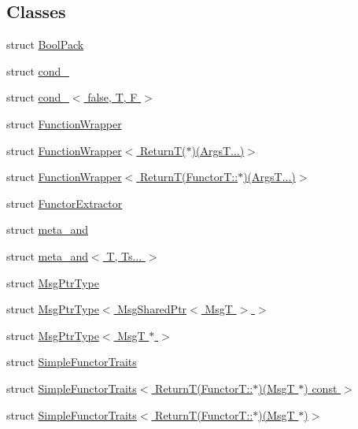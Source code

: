 \subsection*{Classes}
\begin{DoxyCompactItemize}
\item 
struct \hyperlink{structvt_1_1util_1_1_bool_pack}{Bool\+Pack}
\item 
struct \hyperlink{structvt_1_1util_1_1cond__}{cond\+\_\+}
\item 
struct \hyperlink{structvt_1_1util_1_1cond___3_01false_00_01_t_00_01_f_01_4}{cond\+\_\+$<$ false, T, F $>$}
\item 
struct \hyperlink{structvt_1_1util_1_1_function_wrapper}{Function\+Wrapper}
\item 
struct \hyperlink{structvt_1_1util_1_1_function_wrapper_3_01_return_t_07_5_08_07_args_t_8_8_8_08_4}{Function\+Wrapper$<$ Return\+T($\ast$)(\+Args\+T...)$>$}
\item 
struct \hyperlink{structvt_1_1util_1_1_function_wrapper_3_01_return_t_07_functor_t_1_1_5_08_07_args_t_8_8_8_08_4}{Function\+Wrapper$<$ Return\+T(\+Functor\+T\+::$\ast$)(\+Args\+T...)$>$}
\item 
struct \hyperlink{structvt_1_1util_1_1_functor_extractor}{Functor\+Extractor}
\item 
struct \hyperlink{structvt_1_1util_1_1meta__and}{meta\+\_\+and}
\item 
struct \hyperlink{structvt_1_1util_1_1meta__and_3_01_t_00_01_ts_8_8_8_01_4}{meta\+\_\+and$<$ T, Ts... $>$}
\item 
struct \hyperlink{structvt_1_1util_1_1_msg_ptr_type}{Msg\+Ptr\+Type}
\item 
struct \hyperlink{structvt_1_1util_1_1_msg_ptr_type_3_01_msg_shared_ptr_3_01_msg_t_01_4_01_4}{Msg\+Ptr\+Type$<$ Msg\+Shared\+Ptr$<$ Msg\+T $>$ $>$}
\item 
struct \hyperlink{structvt_1_1util_1_1_msg_ptr_type_3_01_msg_t_01_5_01_4}{Msg\+Ptr\+Type$<$ Msg\+T $\ast$ $>$}
\item 
struct \hyperlink{structvt_1_1util_1_1_simple_functor_traits}{Simple\+Functor\+Traits}
\item 
struct \hyperlink{structvt_1_1util_1_1_simple_functor_traits_3_01_return_t_07_functor_t_1_1_5_08_07_msg_t_01_5_08_01const_01_4}{Simple\+Functor\+Traits$<$ Return\+T(\+Functor\+T\+::$\ast$)(\+Msg\+T $\ast$) const $>$}
\item 
struct \hyperlink{structvt_1_1util_1_1_simple_functor_traits_3_01_return_t_07_functor_t_1_1_5_08_07_msg_t_01_5_08_4}{Simple\+Functor\+Traits$<$ Return\+T(\+Functor\+T\+::$\ast$)(\+Msg\+T $\ast$)$>$}
\end{DoxyCompactItemize}
